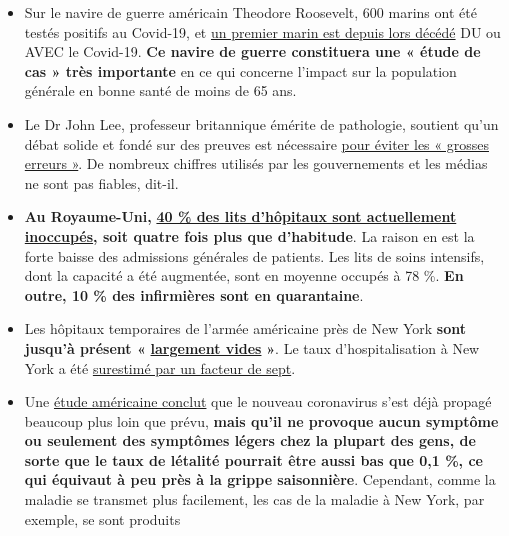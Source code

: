 \begin{itemize}
\tightlist
\item
  Sur le navire de guerre américain Theodore Roosevelt, 600 marins ont
  été testés positifs au Covid-19, et
  \href{https://www.theguardian.com/world/2020/apr/14/sailor-dies-from-covid-19-and-600-test-positive-after-outbreak-on-uss-theodore-roosevelt-guam}{un
  premier marin est depuis lors décédé} DU ou AVEC le Covid-19.
  \textbf{Ce navire de guerre constituera une « étude de cas » très
  importante} en ce qui concerne l'impact sur la population générale en
  bonne santé de moins de 65 ans.
\item
  Le Dr John Lee, professeur britannique émérite de pathologie, soutient
  qu'un débat solide et fondé sur des preuves est nécessaire
  \href{https://www.spectator.co.uk/article/to-understand-covid-we-need-evidence-scepticism-and-vigorous-debate}{pour
  éviter les « grosses erreurs »}. De nombreux chiffres utilisés par les
  gouvernements et les médias ne sont pas fiables, dit-il.
\item
  \textbf{Au Royaume-Uni,}
  \href{https://www.hsj.co.uk/acute-care/nhs-hospitals-have-four-times-more-empty-beds-than-normal/7027392.article}{\textbf{40
  \% des lits d'hôpitaux sont actuellement inoccupés}}\textbf{, soit
  quatre fois plus que d'habitude}. La raison en est la forte baisse des
  admissions générales de patients. Les lits de soins intensifs, dont la
  capacité a été augmentée, sont en moyenne occupés à 78 \%. \textbf{En
  outre, 10 \% des infirmières sont en quarantaine}.
\item
  Les hôpitaux temporaires de l'armée américaine près de New York
  \textbf{sont jusqu'à présent «}
  \href{https://nypost.com/2020/04/09/usns-comfort-and-javits-center-mostly-empty-amid-coronavirus/}{\textbf{largement
  vides}} \textbf{»}. Le taux d'hospitalisation à New York a été
  \href{https://www.nytimes.com/2020/04/10/nyregion/new-york-coronavirus-hospitals.html}{surestimé
  par un facteur de sept}.
\item
  Une
  \href{https://www.medrxiv.org/content/10.1101/2020.04.01.20050542v1}{étude
  américaine conclut} que le nouveau coronavirus s'est déjà propagé
  beaucoup plus loin que prévu, \textbf{mais qu'il ne provoque aucun
  symptôme ou seulement des symptômes légers chez la plupart des gens,
  de sorte que le taux de létalité pourrait être aussi bas que 0,1 \%,
  ce qui équivaut à peu près à la grippe saisonnière}. Cependant, comme
  la maladie se transmet plus facilement, les cas de la maladie à New
  York, par exemple, se sont produits

\end{itemize}
